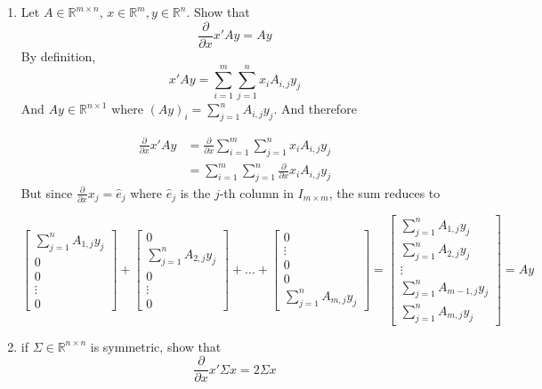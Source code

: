 \documentclass{article}
\begin{document}
\begin{enumerate}
\item Let $A \in \mathbb{R}^{m \times n}$, $x \in \mathbb{R}^m, y \in \mathbb{R}^n$. 
Show that 
$$\frac{\partial}{\partial x}x\prime Ay = Ay$$
By definition, 
$$x \prime Ay = \sum\limits_{i = 1}^m \sum\limits_{j = 1}^n x_i A_{i, j}y_j$$
And $Ay \in \mathbb{R}^{n \times 1}$ where $(Ay)_i = \sum\limits_{j = 1}^n A_{i, j}y_j$.
And therefore 

$$
\begin{array}{rl}
\frac{\partial}{\partial x} x'Ay & = 
\frac{\partial}{\partial x} \sum\limits_{i = 1}^{m} 
\sum\limits_{j = 1}^{n} x_i A_{i, j} y_j \\
&= \sum\limits_{i = 1}^m \sum\limits_{j = 1}^n\frac{\partial}{\partial x} x_i A_{i,j} y_j
\end{array}
$$
But since $\frac{\partial}{\partial x}{x_j} = \hat{e}_j$ where $\hat{e}_j$ is the 
$j$-th column in $I_{m \times m}$, the sum reduces to 

$$
\begin{bmatrix}
\sum\limits_{j = 1}^n A_{1,j}y_j \\
0 \\ 
0\\
\vdots \\
0
\end{bmatrix}
 + 
\begin{bmatrix}
0 \\
\sum\limits_{j = 1}^n A_{2,j}y_j \\
0\\
\vdots \\
0
\end{bmatrix} 
+ ... + 
\begin{bmatrix}
0 \\
\vdots \\
0\\
0\\
\sum\limits_{j = 1}^n A_{m,j}y_j
\end{bmatrix}
= 
\begin{bmatrix}
\sum\limits_{j = 1}^n A_{1, j} y_j\\
\sum\limits_{j = 1}^n A_{2, j} y_j \\
\vdots \\
\sum\limits_{j = 1}^n A_{m - 1, j} y_j \\
\sum\limits_{j = 1}^n A_{m, j} y_j
\end{bmatrix}
= Ay
$$


\item if $\Sigma \in \mathbb{R}^{n \times n}$ is symmetric, show that 
$$\frac{\partial}{\partial x}x\prime \Sigma x = 2 \Sigma x$$


\end{enumerate}
\end{document}

